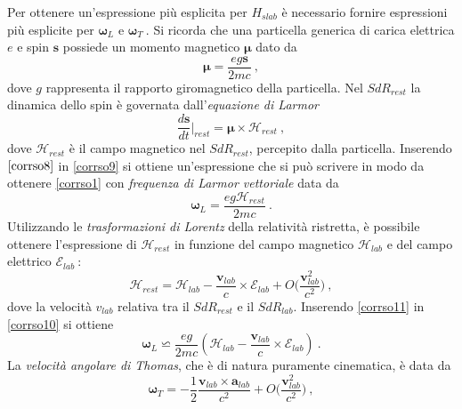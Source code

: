\documentclass[12pt,a4paper]{report}
\numberwithin{equation}{section}
\numberwithin{section}{chapter}
\begin{document}
	Per ottenere un'espressione pi\`u esplicita per $H_{slab}$ \`e necessario fornire espressioni pi\`u esplicite per $\boldsymbol{\omega}_L$ e $\boldsymbol{\omega}_T~$. Si ricorda che una particella generica di carica elettrica $e$ e spin $\boldsymbol{s}$ possiede un momento magnetico $\boldsymbol{\mu}$ dato da
	\begin{equation}
	\label{corrso8}
	\boldsymbol{\mu} = \frac{eg\boldsymbol{s}}{2mc}~,
	\end{equation}
	dove $g$ rappresenta il rapporto giromagnetico della particella. Nel $SdR_{rest}$ la dinamica dello spin \`e governata dall'\textit{equazione di Larmor}
	\begin{equation}
	\label{corrso9}
	\frac{d\boldsymbol{s}}{dt}\bigg\vert_{rest} = \boldsymbol{\mu} \times \boldsymbol{\mathcal{H}}_{rest}~,
	\end{equation}
	dove $\boldsymbol{\mathcal{H}}_{rest}$ \`e il campo magnetico nel $SdR_{rest}$, percepito dalla particella. Inserendo $\eqref{corrso8}$ in \eqref{corrso9} si ottiene un'espressione che si pu\`o scrivere in modo da ottenere \eqref{corrso1} con \textit{frequenza di Larmor vettoriale} data da
	\begin{equation}
	\label{corrso10}
	\boldsymbol{\omega}_{L} = \frac{eg\boldsymbol{\mathcal{H}}_{rest}}{2mc}~.
	\end{equation}
	Utilizzando le \textit{trasformazioni di Lorentz} della relativit\`a ristretta, \`e possibile ottenere l'espressione di $\boldsymbol{\mathcal{H}}_{rest}$ in funzione del campo magnetico $\boldsymbol{\mathcal{H}}_{lab}$ e del campo elettrico $\boldsymbol{\mathcal{E}}_{lab}~$:
	\begin{equation}
	\label{corrso11}
	\boldsymbol{\mathcal{H}}_{rest}  = \boldsymbol{\mathcal{H}}_{lab} - \frac{\boldsymbol{v}_{lab}}{c} \times \boldsymbol{\mathcal{E}}_{lab} + O\bigg(\frac{\boldsymbol{v}_{lab}^2}{c^2}\bigg)~,
	\end{equation}
	dove la velocit\`a $v_{lab}$ relativa tra il $SdR_{rest}$ e il $SdR_{lab}$. Inserendo \eqref{corrso11} in \eqref{corrso10} si ottiene
	\begin{equation}
	\label{corrso12}
	\boldsymbol{\omega}_{L} \backsimeq \frac{eg}{2mc}(\boldsymbol{\mathcal{H}}_{lab} - \frac{\boldsymbol{v}_{lab}}{c} \times \boldsymbol{\mathcal{E}}_{lab})~.
	\end{equation}
	La \textit{velocit\`a angolare di Thomas}, che \`e di natura puramente cinematica, \`e data da
	\begin{equation}
	\label{corrso13}
	\boldsymbol{\omega}_T = -\frac{1}{2}\frac{\boldsymbol{v}_{lab} \times \boldsymbol{a}_{lab}}{c^2} + O\bigg(\frac{\boldsymbol{v}_{lab}^2}{c^2}\bigg)~,
	\end{equation}
\end{document}
